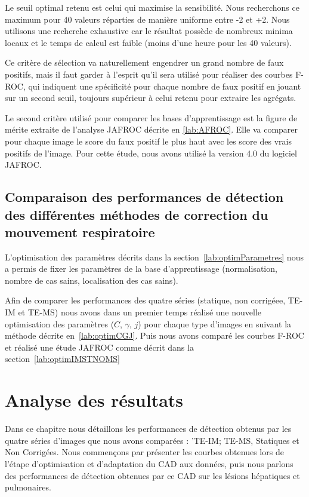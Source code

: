 Le seuil optimal retenu est celui qui maximise la sensibilité. Nous recherchons ce maximum pour 40 valeurs réparties de manière uniforme entre -2 et +2. Nous utilisons une recherche exhaustive car le résultat possède de nombreux minima locaux et le temps de calcul est faible (moins d'une heure pour les 40 valeurs).

Ce critère de sélection va naturellement engendrer un grand nombre de faux positifs, mais il faut garder à l'esprit qu'il sera utilisé pour réaliser des courbes F-ROC, qui indiquent une spécificité pour chaque nombre de faux positif en jouant sur un second seuil, toujours supérieur à celui retenu pour extraire les agrégats.

Le second critère utilisé pour comparer les bases d'apprentissage est la figure de mérite extraite de l'analyse JAFROC décrite en \ref{lab:AFROC}. Elle va comparer pour chaque image le score du faux positif le plus haut avec les score des vrais positifs de l'image. Pour cette étude, nous avons utilisé la version 4.0 du logiciel JAFROC.

\section{Comparaison des performances de détection des différentes méthodes de correction du mouvement respiratoire}

L'optimisation des paramètres décrits dans la section~\ref{lab:optimParametres} nous a permis de fixer les paramètres de la base d'apprentissage (normalisation, nombre de cas sains, localisation des cas sains).

Afin de comparer les performances des quatre séries (statique, non corrigéee, TE-IM et TE-MS) nous avons dans un premier temps réalisé une nouvelle optimisation des paramètres ($C$, $\gamma$, $j$) pour chaque type d'images en suivant la méthode décrite en~\ref{lab:optimCGJ}. Puis nous avons comparé les courbes F-ROC et réalisé une étude JAFROC comme décrit dans la section~\ref{lab:optimIMSTNOMS}





\chapter{Analyse des résultats}

Dans ce chapitre nous détaillons les performances de détection obtenus par les quatre séries d'images que nous avons comparées : 'TE-IM; TE-MS, Statiques et Non Corrigées. Nous commençons par présenter les courbes obtenues lors de l'étape d'optimisation et d'adaptation du CAD aux données, puis nous parlons des performances de détection obtenues par ce CAD sur les lésions hépatiques et pulmonaires.


